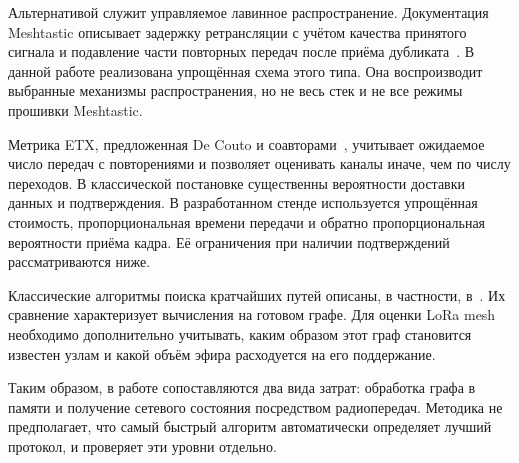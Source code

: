 Альтернативой служит управляемое лавинное распространение. Документация Meshtastic описывает задержку ретрансляции с учётом качества принятого сигнала и подавление части повторных передач после приёма дубликата~\cite{meshtastic}. В данной работе реализована упрощённая схема этого типа. Она воспроизводит выбранные механизмы распространения, но не весь стек и не все режимы прошивки Meshtastic.

Метрика ETX, предложенная De Couto и соавторами~\cite{etx}, учитывает ожидаемое число передач с повторениями и позволяет оценивать каналы иначе, чем по числу переходов. В классической постановке существенны вероятности доставки данных и подтверждения. В разработанном стенде используется упрощённая стоимость, пропорциональная времени передачи и обратно пропорциональная вероятности приёма кадра. Её ограничения при наличии подтверждений рассматриваются ниже.

Классические алгоритмы поиска кратчайших путей описаны, в частности, в~\cite{cormen}. Их сравнение характеризует вычисления на готовом графе. Для оценки LoRa mesh необходимо дополнительно учитывать, каким образом этот граф становится известен узлам и какой объём эфира расходуется на его поддержание.

Таким образом, в работе сопоставляются два вида затрат: обработка графа в памяти и получение сетевого состояния посредством радиопередач. Методика не предполагает, что самый быстрый алгоритм автоматически определяет лучший протокол, и проверяет эти уровни отдельно.
